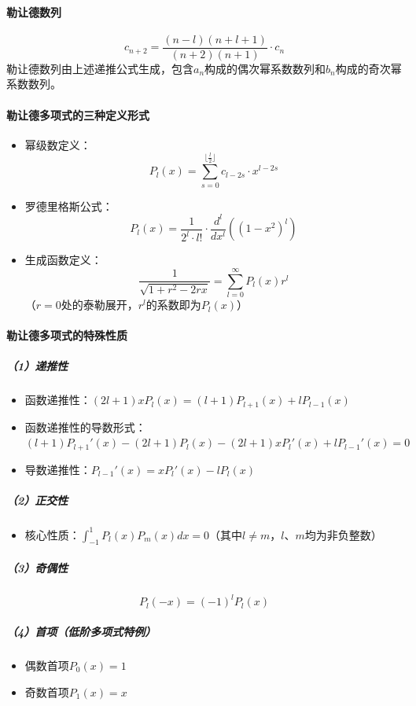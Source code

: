 \documentclass{article}
\begin{document}
	\paragraph{勒让德数列}
	\[
	c_{n+2} = \frac{(n - l)(n + l + 1)}{(n + 2)(n + 1)} \cdot c_n
	\]
	勒让德数列由上述递推公式生成，包含\(a_n\)构成的偶次幂系数数列和\(b_n\)构成的奇次幂系数数列。
	
	\paragraph{勒让德多项式的三种定义形式}
	\begin{itemize}
		\item 幂级数定义：
		\[
		P_l(x) = \sum_{s=0}^{\lfloor \frac{l}{2} \rfloor} c_{l - 2s} \cdot x^{l - 2s}
		\]
		\item 罗德里格斯公式：
		\[
		P_l(x) = \frac{1}{2^l \cdot l!} \cdot \frac{d^l}{dx^l} \left( (1 - x^2)^l \right)
		\]
		\item 生成函数定义：
		\[
		\frac{1}{\sqrt{1 + r^2 - 2rx}} = \sum_{l=0}^{\infty} P_l(x) r^l
		\]
		（\(r = 0\)处的泰勒展开，\(r^l\)的系数即为\(P_l(x)\)）
	\end{itemize}
	
	\paragraph{勒让德多项式的特殊性质}
	
	\subparagraph{（1）递推性}
	\begin{itemize}
		\item 函数递推性：\((2l + 1) x P_l(x) = (l + 1) P_{l + 1}(x) + l P_{l - 1}(x)\)
		\item 函数递推性的导数形式：\((l + 1) P_{l + 1}'(x) - (2l + 1) P_l(x) - (2l + 1) x P_l'(x) + l P_{l - 1}'(x) = 0\)
		\item 导数递推性：\(P_{l - 1}'(x) = x P_l'(x) - l P_l(x)\)
	\end{itemize}
	
	\subparagraph{（2）正交性}
	\begin{itemize}
		\item 核心性质：\(\int_{-1}^{1} P_l(x) P_m(x) dx = 0\)（其中\(l \neq m\)，\(l\)、\(m\)均为非负整数）
	\end{itemize}
	
	\subparagraph{（3）奇偶性}

		 \[P_l(-x) = (-1)^l P_l(x)\]

	
	\subparagraph{（4）首项（低阶多项式特例）}
	\begin{itemize}
		\item 偶数首项\(P_0(x) = 1\)
		\item 奇数首项\(P_1(x) = x\)
	\end{itemize}
	
\end{document}
